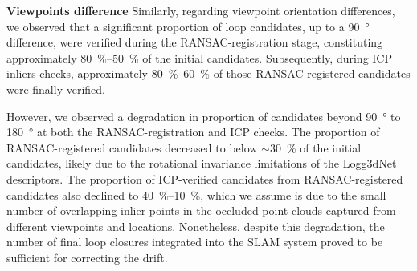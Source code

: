 \noindent \textbf{Viewpoints difference}\hspace{0.5em} Similarly, regarding viewpoint orientation differences, we observed that a significant proportion of loop candidates, up to a \SI{90}{\degree} difference, were verified during the RANSAC-registration stage, constituting approximately  \SIrange{80}{50}{\percent} of the initial candidates. Subsequently, during ICP inliers checks, approximately \SIrange{80}{60}{\percent} of those RANSAC-registered candidates were finally verified. 

However, we observed a degradation in proportion of candidates beyond \SI{90}{\degree} to \SI{180}{\degree} at both the RANSAC-registration and ICP checks. The proportion of RANSAC-registered candidates decreased to below $\sim$\SI{30}{\percent} of the initial candidates, likely due to the rotational invariance limitations of the Logg3dNet descriptors. The proportion of ICP-verified candidates from RANSAC-registered candidates also declined to \SIrange{40}{10}{\percent}, which we assume is due to the small number of overlapping inlier points in the occluded point clouds captured from different viewpoints and locations.
Nonetheless, despite this degradation, the number of final loop closures integrated into the SLAM system proved to be sufficient for correcting the drift.   





